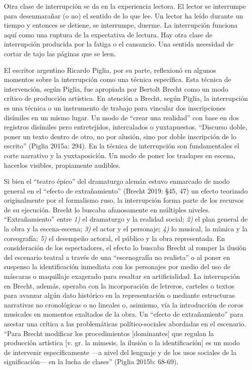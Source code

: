 \documentclass[
]{interact}
\begin{document}
Otra clase de interrupción se da en la experiencia lectora. El lector se
interrumpe para desenmarañar (o no) el sentido de lo que lee. Un lector
ha leído durante un tiempo y entonces se detiene, se interrumpe, duerme.
La interrupción funciona aquí como una ruptura de la expectativa de
lectura. Hay otra clase de interrupción producida por la fatiga o el
cansancio. Una sentida necesidad de cortar de tajo las páginas que se
leen.

El escritor argentino Ricardo Piglia, por su parte, reflexionó en
algunos momentos sobre la interrupción como una técnica específica. Esta
técnica de intervención, según Piglia, fue apropiada por Bertolt Brecht
como un modo crítico de producción artística. En atención a Brecht,
según Piglia, la interrupción es una técnica o un instrumento de trabajo
para vincular dos inscripciones disímiles en un mismo lugar. Un modo de
``crear una realidad'' con base en dos registros disímiles pero
entretejidos, intercalados o yuxtapuestos. ``Discurso doble, poner un
texto dentro de otro, no por alusión, sino por doble inscripción de lo
escrito'' (Piglia 2015a: 294). En la técnica de interrupción son
fundamentales el corte narrativo y la yuxtaposición. Un modo de poner
los traslapes en escena, hacerlos visibles, propiamente audibles.

Si bien el ``teatro épico'' del dramaturgo alemán estuvo enmarcado de
modo general en el ``efecto de extrañamiento'' (Brecht 2019: §45, 47) un
efecto teorizado originalmente por el formalismo ruso, la interrupción
forma parte de los recursos de su ejecución. Brecht lo buscaba
afanosamente en múltiples niveles. ``Extrañamiento'' entre \emph{1)} el
dramaturgo y la realidad social; \emph{2)} el plan general de la obra y
la escena-escena; \emph{3)} el actor y el personaje; \emph{4)} lo
musical, la mímica y la coreografía; \emph{5)} el desempeño actoral, el
público y la obra representada. En consideración de los espectadores, el
efecto lo buscaba Brecht al romper la ilusión del escenario teatral a
través de una ``escenografía no realista'' o al poner en suspenso la
identificación inmediata con los personajes por medio del uso de
máscaras o maquillaje exagerado para resaltar su artificialidad. La
interrupción en Brecht, además, operaba con la incorporación de
letreros, carteles o textos para avanzar algún dato histórico en la
representación o mediante estructuras narrativas no cronológicas o no
lineales o, asimismo, vía la introducción de coros musicales en momentos
exaltados de la obra. Un ``efecto de extrañamiento'' para asestar una
crítica a las problemáticas político-sociales abordadas en el escenario.
``Para Brecht modificar los procedimientos {[}dominantes{]} que regulan
la producción artística {[}v. gr. la mimesis, la ilusión o la
identificación{]} es un modo de intervenir específicamente ---a nivel
del lenguaje y de los usos sociales de la significación--- en la lucha
de clases'' (Piglia 2015b: 68-69).
\end{document}
